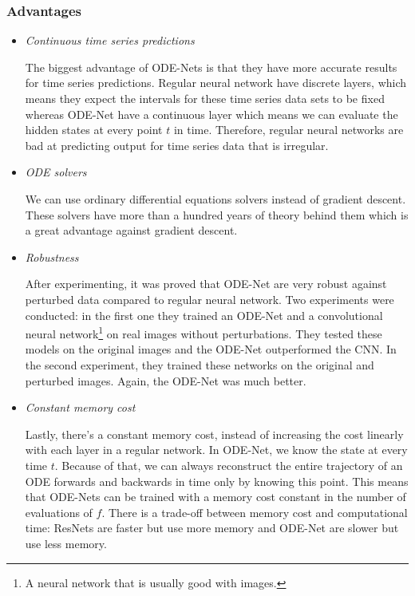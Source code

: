 \documentclass[10pt,a4paper]{article}
\theoremstyle{definition}
\theoremstyle{definition}
\theoremstyle{definition}
\begin{document}
\subsubsection*{Advantages}
\begin{itemize}
\item \textit{Continuous time series predictions}

The biggest advantage of ODE-Nets is that they have more accurate results for time series predictions. Regular neural network have discrete layers, which means they expect the intervals for these time series data sets to be fixed whereas ODE-Net have a continuous layer which means we can evaluate the hidden states at every point $t$ in time. Therefore, regular neural networks are bad at predicting output for time series data that is irregular.

\item \textit{ODE solvers}

We can use ordinary differential equations solvers instead of gradient descent. These solvers have more than a hundred years of theory behind them which is a great advantage against gradient descent.

\item \textit{Robustness} \cite{4}

After experimenting, it was proved that ODE-Net are very robust against perturbed data compared to regular neural network. Two experiments were conducted: in the first one they trained an ODE-Net and a convolutional neural network\footnote{A neural network that is usually good with images.} on real images without perturbations. They tested these models on the original images and the ODE-Net outperformed the CNN. In the second experiment, they trained these networks on the original and perturbed images. Again, the ODE-Net was much better.

\item \textit{Constant memory cost}

Lastly, there's a constant memory cost, instead of increasing the cost linearly with each layer in a regular network. 
In ODE-Net, we know the state at every time $t$. Because of that, we can always reconstruct the entire trajectory of an ODE forwards and backwards in time only by knowing this point. This means that ODE-Nets can be trained with a memory cost constant in the number of evaluations of $f$.
There is a trade-off between memory cost and computational time: ResNets are faster but use more memory and ODE-Net are slower but use less memory.
\end{itemize}
\end{document}
